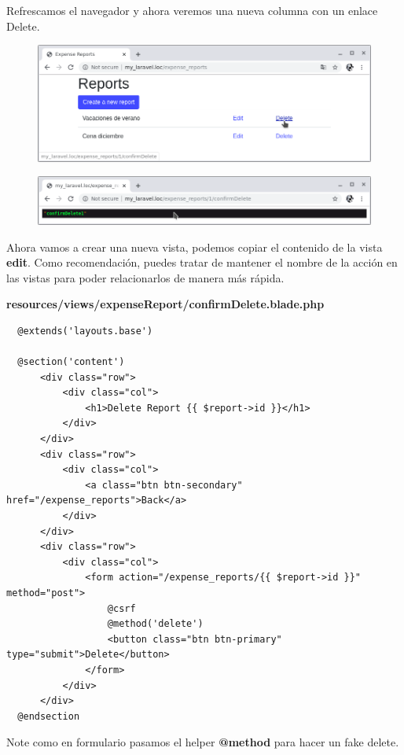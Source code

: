 \documentclass{article}
\begin{document}
Refrescamos el navegador y ahora veremos una nueva columna con un enlace
Delete.\\

\begin{figure}[h!]
  \centering
  \includegraphics[scale=0.5]{./Pictures/077_delete.png}
\end{figure}

\begin{figure}[h!]
  \centering
  \includegraphics[scale=0.5]{./Pictures/078_confirm_delete1.png}
\end{figure}

Ahora vamos a crear una nueva vista, podemos copiar el contenido de la vista
\textbf{edit}. Como recomendación, puedes tratar de mantener el nombre de la
acción en las vistas para poder relacionarlos de manera más rápida.

\textbf{resources/views/expenseReport/confirmDelete.blade.php}
\begin{verbatim}
  @extends('layouts.base')

  @section('content')
      <div class="row">
          <div class="col">
              <h1>Delete Report {{ $report->id }}</h1>
          </div>
      </div>
      <div class="row">
          <div class="col">
              <a class="btn btn-secondary" href="/expense_reports">Back</a>
          </div>
      </div>
      <div class="row">
          <div class="col">
              <form action="/expense_reports/{{ $report->id }}" method="post">
                  @csrf
                  @method('delete')
                  <button class="btn btn-primary" type="submit">Delete</button>
              </form>
          </div>
      </div>
  @endsection
\end{verbatim}

Note como en formulario pasamos el helper \textbf{@method} para hacer un fake
delete.\\
\end{document}
